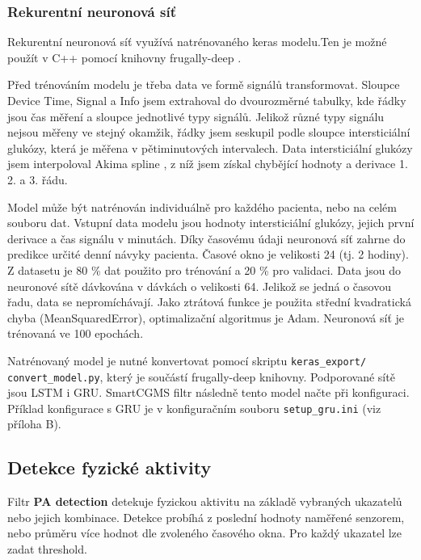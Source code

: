 \subsubsection{Rekurentní neuronová síť}

Rekurentní neuronová síť využívá natrénovaného keras modelu.Ten je možné použít v C++ pomocí knihovny frugally-deep \citep{cho.frugally}.

Před trénováním modelu je třeba data ve formě signálů transformovat. Sloupce Device Time, Signal a Info jsem extrahoval do dvourozměrné tabulky, kde řádky jsou čas měření a sloupce jednotlivé typy signálů. Jelikož různé typy signálu nejsou měřeny ve stejný okamžik, řádky jsem seskupil podle sloupce intersticiální glukózy, která je měřena v pětiminutových intervalech. Data intersticiální glukózy jsem interpoloval Akima spline \citep{cho.akima}, z níž jsem získal chybějící hodnoty a derivace 1. 2. a 3. řádu.

Model může být natrénován individuálně pro každého pacienta, nebo na celém souboru dat. Vstupní data modelu jsou hodnoty intersticiální glukózy, jejich první derivace a čas signálu v minutách. Díky časovému údaji neuronová síť zahrne do predikce určité denní návyky pacienta. Časové okno je velikosti 24 (tj. 2 hodiny). Z datasetu je 80 \% dat použito pro trénování a 20 \% pro validaci. Data jsou do neuronové sítě dávkována v dávkách o velikosti 64. Jelikož se jedná o časovou řadu, data se nepromíchávají. Jako ztrátová funkce je použita střední kvadratická chyba (MeanSquaredError), optimalizační algoritmus je Adam. Neuronová síť je trénovaná ve 100 epochách. 

Natrénovaný model je nutné konvertovat pomocí skriptu \texttt{keras\_export/ convert\_model.py}, který je součástí frugally-deep knihovny. Podporované sítě jsou LSTM i GRU. SmartCGMS filtr následně tento model načte při konfiguraci. Příklad konfigurace s GRU je v konfiguračním souboru \texttt{setup\_gru.ini} (viz příloha B).



\subsection{Detekce fyzické aktivity}

Filtr \textbf{PA detection} detekuje fyzickou aktivitu na základě vybraných ukazatelů nebo jejich kombinace. Detekce probíhá z poslední hodnoty naměřené senzorem, nebo průměru více hodnot dle zvoleného časového okna. Pro každý ukazatel lze zadat threshold.

